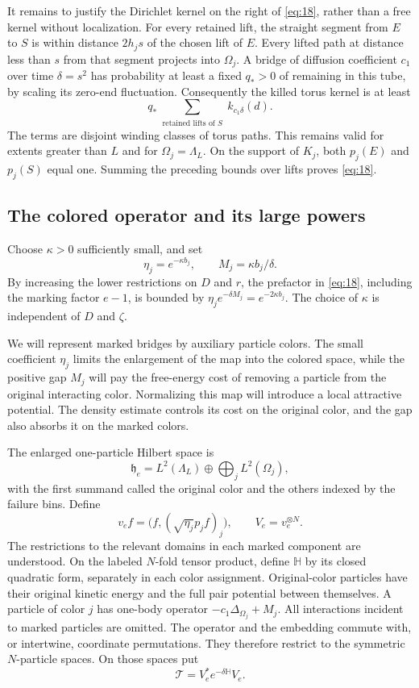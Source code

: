 It remains to justify the Dirichlet kernel on the right of
\eqref{eq:18}, rather than a free kernel without localization.
For every retained lift, the straight segment from $E$ to $S$
is within distance $2h_js$ of the chosen lift of $E$.  Every lifted
path at distance less than $s$ from that segment projects into
$\Omega_j$.  A bridge of diffusion coefficient $c_1$ over time
$\delta=s^2$ has probability at least a fixed $q_*>0$ of remaining
in this tube, by scaling its zero-end fluctuation.  Consequently
the killed torus kernel is at least
\[
 q_*\sum_{\substack{\text{retained lifts of }S}}
                  k_{c_1\delta}(d).
\]
The terms are disjoint winding classes of torus paths.  This remains
valid for extents greater than $L$ and for $\Omega_j=\Lambda_L$.
On the support of $K_j$, both $p_j(E)$ and $p_j(S)$ equal one.
Summing the preceding bounds over lifts proves \eqref{eq:18}.

\subsection{The colored operator and its large powers}

Choose $\kappa>0$ sufficiently small, and set
\[
 \eta_j=e^{-\kappa b_j},\qquad M_j=\kappa b_j/\delta.
\]
By increasing the lower restrictions on $D$ and $r$, the prefactor
in \eqref{eq:18}, including the marking factor $e-1$, is bounded by
$\eta_j e^{-\delta M_j}=e^{-2\kappa b_j}$.  The choice of $\kappa$
is independent of $D$ and $\zeta$.

We will represent marked bridges by auxiliary particle colors. The small
coefficient $\eta_j$ limits the enlargement of the map into the colored
space, while the positive gap $M_j$ will pay the free-energy cost of
removing a particle from the original interacting color. Normalizing this
map will introduce a local attractive potential. The density estimate
controls its cost on the original color, and the gap also absorbs it on
the marked colors.

The enlarged one-particle Hilbert space is
\[
 \mathfrak h_e=L^2(\Lambda_L)
                    \oplus\bigoplus_j L^2(\Omega_j),
\]
with the first summand called the original color and the others
indexed by the failure bins.  Define
\[
 v_e f=\bigl(f,(\sqrt{\eta_j}p_jf)_j\bigr),
 \qquad V_e=v_e^{\otimes N}.
\]
The restrictions to the relevant domains in each marked component
are understood.  On the labeled $N$-fold tensor product, define
$\mathbb H$ by its closed quadratic form, separately in each
color assignment.  Original-color particles have their original
kinetic energy and the full pair potential between themselves.
A particle of color $j$ has one-body operator
$-c_1\Delta_{\Omega_j}+M_j$.  All interactions incident to marked
particles are omitted.  The operator and the embedding commute
with, or intertwine, coordinate permutations.  They therefore
restrict to the symmetric $N$-particle spaces.  On those spaces put
\[
 \mathcal T=V_e^*e^{-\delta\mathbb H}V_e.
\]


